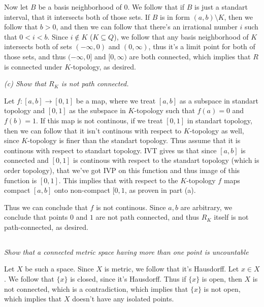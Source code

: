 \documentclass[11pt,oneside,titlepage]{book}
\newcommand{\set}[1]{\{ #1 \}}
\begin{document}
Now let $B$ be a basis neighborhood of $0$. We follow that if $B$ is just a standart interval,
that it intersects both of those sets. If $B$ is in form $(a, b) \setminus K$, then we follow that
$b > 0$, and then we can follow that there's an irrational number $i$ such that
$0 < i < b$. Since $i \notin K$ ($K \subseteq Q$), we follow that any basis neighborhood
of $K$ intersects both of sets $(-\infty, 0)$ and $(0, \infty)$, thus it's a
limit point for both of those sets, and thus $(-\infty, 0]$ and $[0, \infty)$ are
both connected, which implies that $R$ is connected under $K$-topology, as desired.

\textit{(c) Show that $R_K$ is not path connected.}

Let $f: [a, b] \to [0, 1]$ be a map, where we treat $[a, b]$ as a subspace in standart topology
and $[0, 1]$ as the subspace in $K$-topology such that $f(a) = 0$ and $f(b) = 1$. If this
map is not continous, if we treat $[0, 1]$ in standart topology, then we can follow that
it isn't continous with respect to $K$-topology as well, since $K$-topology is finer than
the standart topology. Thus assume that it is continous with respect to standart topology.
IVT gives us that since $[a, b]$ is connected and $[0, 1]$ is continous with respect to
the standart topology (which is order topology), that we've got IVP on this function
and thus image of this function is $[0, 1]$. This implies that with respect to the
$K$-topology $f$ maps compact $[a, b]$ onto non-compact $[0, 1$, as proven in part (a).

Thus we can conclude that $f$ is not continous. Since $a, b$ are arbitrary, we conclude that
points $0$ and $1$ are not path connected, and thus $R_K$ itself is not path-connected, as desired.

\subsection{}

\textit{Show that a connected metric space having more than one point is uncountable}

Let $X$ be such a space. Since $X$ is metric, we follow that it's Hausdorff. Let $x \in X$.
We follow that $\set{x}$ is closed, since it's Hausdorff. Thus if $\set{x}$ is open,
then $X$ is not connected, which is a contradiction, which implies that $\set{x}$
is not open, which implies that $X$ doesn't have any isolated points.
\end{document}
